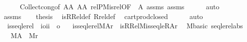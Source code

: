 \begin{isabellebody}
\ \ \ \ \isamarkupfalse%
\ Collect{\isacharunderscore}{\kern0pt}cong{\isacharbrackleft}{\kern0pt}of\ {\isachardoublequoteopen}A{\isasymtimes}A{\isachardoublequoteclose}\ {\isachardoublequoteopen}A{\isasymtimes}A{\isachardoublequoteclose}\ {\isachardoublequoteopen}relP{\isacharparenleft}{\kern0pt}M{\isacharcomma}{\kern0pt}is{\isacharunderscore}{\kern0pt}rel{\isacharparenright}{\kern0pt}{\isachardoublequoteclose}{\isacharcomma}{\kern0pt}OF\ {\isacharunderscore}{\kern0pt}\ A{\isacharparenleft}{\kern0pt}{}{\isacharparenright}{\kern0pt}{\isacharbrackright}{\kern0pt}\ assms{\isacharparenleft}{\kern0pt}{}{\isacharparenright}{\kern0pt}\ assms{\isacharparenleft}{\kern0pt}{}{\isacharparenright}{\kern0pt}\isanewline
\ \ \ \ \isamarkupfalse%
\ auto\isanewline
\ \ \isamarkupfalse%
\ assms\isanewline
\ \ \isamarkupfalse%
\ {\isacharquery}{\kern0pt}thesis\ \isamarkupfalse%
\ is{\isacharunderscore}{\kern0pt}RRel{\isacharunderscore}{\kern0pt}def\ Rrel{\isacharunderscore}{\kern0pt}def\ \isamarkupfalse%
\ cartprod{\isacharunderscore}{\kern0pt}closed\isanewline
\ \ \ \ \isamarkupfalse%
\ auto\isanewline
{}\isamarkupfalse%
%
\endisatagproof
{\isafoldproof}%
%
\isadelimproof
\isanewline
%
\endisadelimproof
\isanewline
{}\isamarkupfalse%
\isanewline
\ \ is{\isacharunderscore}{\kern0pt}seqlerel\ {\isacharcolon}{\kern0pt}{\isacharcolon}{\kern0pt}\ {\isachardoublequoteopen}{\isacharbrackleft}{\kern0pt}i{\isasymRightarrow}o{\isacharcomma}{\kern0pt}i{\isacharcomma}{\kern0pt}i{\isacharbrackright}{\kern0pt}\ {\isasymRightarrow}\ o{\isachardoublequoteclose}\ \isanewline
\ \ {\isachardoublequoteopen}is{\isacharunderscore}{\kern0pt}seqlerel{\isacharparenleft}{\kern0pt}M{\isacharcomma}{\kern0pt}A{\isacharcomma}{\kern0pt}r{\isacharparenright}{\kern0pt}\ {\isasymequiv}\ is{\isacharunderscore}{\kern0pt}RRel{\isacharparenleft}{\kern0pt}M{\isacharcomma}{\kern0pt}is{\isacharunderscore}{\kern0pt}seqleR{\isacharcomma}{\kern0pt}A{\isacharcomma}{\kern0pt}r{\isacharparenright}{\kern0pt}{\isachardoublequoteclose}\isanewline
\isanewline
{}\isamarkupfalse%
\ {\isacharparenleft}{\kern0pt}\ M{\isacharunderscore}{\kern0pt}basic{\isacharparenright}{\kern0pt}\ seqlerel{\isacharunderscore}{\kern0pt}abs\ {\isacharcolon}{\kern0pt}\isanewline
\ \ \ {\isachardoublequoteopen}M{\isacharparenleft}{\kern0pt}A{\isacharparenright}{\kern0pt}{\isachardoublequoteclose}\ \ {\isachardoublequoteopen}M{\isacharparenleft}{\kern0pt}r{\isacharparenright}{\kern0pt}{\isachardoublequoteclose}\isanewline

\end{isabellebody}
